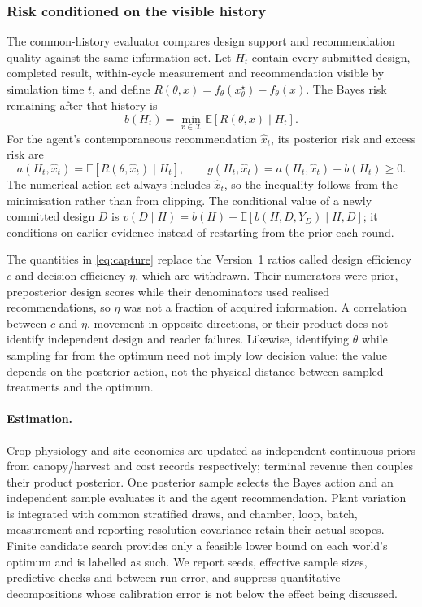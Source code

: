 \subsubsection{Risk conditioned on the visible history}
\label{sec:eig}

The common-history evaluator compares design support and recommendation quality against the
same information set. Let
$H_t$ contain every submitted design, completed result, within-cycle measurement and
recommendation visible by simulation time $t$, and define
$R(\theta,x)=f_\theta(x^\star_\theta)-f_\theta(x)$.  The Bayes risk remaining after that
history is
\begin{equation}
b(H_t)=\min_{x\in\mathcal X}\mathbb E[R(\theta,x)\mid H_t].
\label{eq:eig}
\end{equation}
For the agent's contemporaneous recommendation $\hat x_t$, its posterior risk and excess
risk are
\begin{equation}
a(H_t,\hat x_t)=\mathbb E[R(\theta,\hat x_t)\mid H_t],\qquad
g(H_t,\hat x_t)=a(H_t,\hat x_t)-b(H_t)\geq0.
\label{eq:capture}
\end{equation}
The numerical action set always includes $\hat x_t$, so the inequality follows from the
minimisation rather than from clipping.  The conditional value of a newly committed design
$D$ is $v(D\mid H)=b(H)-\mathbb E[b(H,D,Y_D)\mid H,D]$; it conditions on earlier evidence
instead of restarting from the prior each round.

The quantities in \eqref{eq:capture} replace the Version~1 ratios called design efficiency
$c$ and decision efficiency $\eta$, which are
withdrawn.  Their numerators were prior, preposterior design scores while their denominators
used realised recommendations, so $\eta$ was not a fraction of acquired information.  A
correlation between $c$ and $\eta$, movement in opposite directions, or their product does
not identify independent design and reader failures.  Likewise, identifying $\theta$ while
sampling far from the optimum need not imply low decision value: the value depends on the
posterior action, not the physical distance between sampled treatments and the optimum.

\paragraph{Estimation.}\label{sec:estimator} Crop physiology and site economics are updated
as independent continuous priors from canopy/harvest and cost records respectively;
terminal revenue then couples their product posterior.  One posterior sample selects the
Bayes action and an independent sample evaluates it and the agent recommendation.  Plant
variation is integrated with common stratified draws, and chamber, loop, batch, measurement
and reporting-resolution covariance retain their actual scopes.  Finite candidate search
provides only a feasible lower bound on each world's optimum and is labelled as such.  We
report seeds, effective sample sizes, predictive checks and between-run error, and suppress
quantitative decompositions whose calibration error is not below the effect being discussed.
